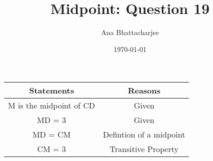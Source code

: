 \documentclass{article}
\begin{document}
\author{Ana Bhattacharjee}
\title{Midpoint: Question 19}
\date{\today}
\maketitle{}


\begin{center}
\begin{tabular}{|c|c|}
\hline
\textbf{Statements} & \textbf{Reasons} \\
\hline
M is the midpoint of CD & Given \\
\hline
MD = 3 & Given \\
\hline
MD = CM & Defintion of a midpoint \\
\hline
CM = 3 & Transitive Property \\
\hline
\end{tabular}
\end{center}
\end{document}
